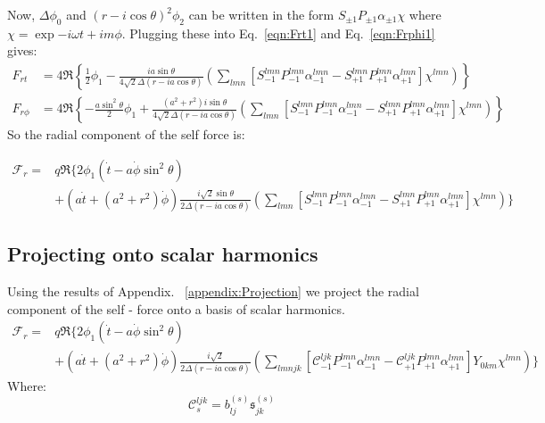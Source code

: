 \documentclass[preprint,showpacs,preprintnumbers,amssymb,superscriptaddress,aps,prd,nofootinbib,11pt]{revtex4-1}
\begin{document}
Now, $\Delta \phi_0$ and $(r-i\cos\theta)^2 \phi_2$ can be written in the form $S_{\pm1} P_{\pm1} \alpha_{\pm 1} \chi$ where $\chi = \exp{-i\omega  t + i m\phi}$. Plugging these into Eq.~\eqref{eqn:Frt1} and Eq.~\eqref{eqn:Frphi1} gives:
\begin{align}
    F_{rt} &= 4 \Re\left\{\frac{1}{2} \phi_1 - \frac{i a \sin\theta}{4 \sqrt{2} \Delta(r-ia\cos\theta)} \left(\sum\limits_{lmn} \left[S^{lmn}_{-1} P^{lmn}_{-1} \alpha^{lmn}_{-1} - S^{lmn}_{+1} P^{lmn}_{+1} \alpha^{lmn}_{+1}\right]\chi^{lmn}\right)\right\}\\
    F_{r\phi} &= 4 \Re \left\{-\frac{a \sin^2\theta}{2} \phi_1 + \frac{(a^2+r^2) i \sin\theta}{4\sqrt{2} \Delta (r-ia\cos\theta)} \left(\sum\limits_{lmn} \left[S^{lmn}_{-1} P^{lmn}_{-1} \alpha^{lmn}_{-1} - S^{lmn}_{+1} P^{lmn}_{+1} \alpha^{lmn}_{+1}\right]\chi^{lmn}\right) \right\}
\end{align}
So the radial component of the self force is:

\begin{align}
    \mathcal{F}_r =& q\Re\Bigg\{2\phi_1 (\dot{t}- a\dot{\phi} \sin^2\theta) \nonumber\\
    &+ \left(a \dot{t} + (a^2 +r^2)\dot{\phi} \right)\frac{i\sqrt{2} \sin\theta}{2 \Delta (r-ia \cos \theta) } \left(\sum\limits_{lmn} \left[S^{lmn}_{-1} P^{lmn}_{-1} \alpha^{lmn}_{-1} - S^{lmn}_{+1} P^{lmn}_{+1} \alpha^{lmn}_{+1}\right]\chi^{lmn}\right) \Bigg\}
\end{align}
\subsection{Projecting onto scalar harmonics}
Using the results of Appendix.~ \ref{appendix:Projection} we project the radial component of the self - force onto a basis of scalar harmonics.
\begin{align}
     \mathcal{F}_r =& q\Re\Bigg\{2\phi_1 (\dot{t}- a\dot{\phi} \sin^2\theta) \nonumber\\
    &+ \left(a \dot{t} + (a^2 +r^2)\dot{\phi} \right)\frac{i\sqrt{2} }{2\Delta (r-ia \cos \theta) } \left(\sum\limits_{lmnjk} \left[\mathcal{C}^{ljk}_{-1} P^{lmn}_{-1} \alpha^{lmn}_{-1} - \mathcal{C}^{ljk}_{+1} P^{lmn}_{+1} \alpha^{lmn}_{+1}\right]Y_{0km}\chi^{lmn}\right) \Bigg\}
\end{align}
Where:
\begin{equation}
    \mathcal{C}_s^{ljk} = b_{lj}^{(s)} \mathfrak{s}_{jk}^{(s)}
\end{equation}
\end{document}
